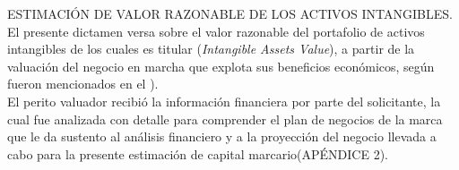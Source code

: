 \textcolor{secundario}{ESTIMACI\'ON DE VALOR RAZONABLE DE LOS ACTIVOS INTANGIBLES.} El presente dictamen versa sobre el valor razonable del portafolio de activos intangibles de los cuales es titular \empresaSolicitante{}(\textit{Intangible Assets Value}), a partir de la valuaci\'on del negocio en marcha que explota sus beneficios econ\'omicos, seg\'un fueron mencionados en el ).\\[10pt]

El perito valuador recibi\'o la informaci\'on financiera por parte del solicitante, la cual fue analizada con detalle para comprender el plan de negocios de la marca que le da sustento al an\'alisis financiero y a la proyecci\'on del negocio llevada a cabo para la presente estimaci\'on de capital marcario(\textcolor{terciario}{AP\'ENDICE 2}).\\[10pt] 

